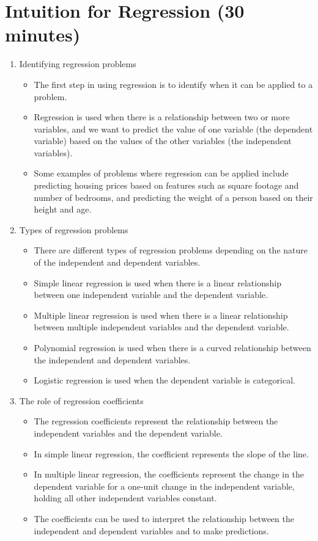 \documentclass{article}
\begin{document}
\section{Intuition for Regression (30 minutes)}
\begin{enumerate}[label=\alph*)]
\item Identifying regression problems
\begin{itemize}
\item The first step in using regression is to identify when it can be applied to a problem.
\item Regression is used when there is a relationship between two or more variables, and we want to predict the value of one variable (the dependent variable) based on the values of the other variables (the independent variables).
\item Some examples of problems where regression can be applied include predicting housing prices based on features such as square footage and number of bedrooms, and predicting the weight of a person based on their height and age.
\end{itemize}

\item Types of regression problems
\begin{itemize}
\item There are different types of regression problems depending on the nature of the independent and dependent variables.
\item Simple linear regression is used when there is a linear relationship between one independent variable and the dependent variable.
\item Multiple linear regression is used when there is a linear relationship between multiple independent variables and the dependent variable.
\item Polynomial regression is used when there is a curved relationship between the independent and dependent variables.
\item Logistic regression is used when the dependent variable is categorical.
\end{itemize}

\item The role of regression coefficients
\begin{itemize}
\item The regression coefficients represent the relationship between the independent variables and the dependent variable.
\item In simple linear regression, the coefficient represents the slope of the line.
\item In multiple linear regression, the coefficients represent the change in the dependent variable for a one-unit change in the independent variable, holding all other independent variables constant.
\item The coefficients can be used to interpret the relationship between the independent and dependent variables and to make predictions.
\end{itemize}


\end{enumerate}
\end{document}
